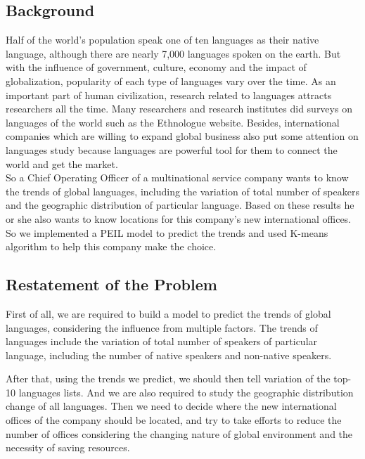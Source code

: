 \documentclass{mcmthesis}
\begin{document}
\subsection{Background}
  \indent \indent Half of the world's population speak one of ten languages as their native language, although there are nearly 7,000 languages spoken on the earth. But with the influence of government, culture, economy and the impact of globalization, popularity of each type of languages vary over the time. As an important part of human civilization, research related to languages attracts researchers all the time. Many researchers and research institutes did surveys on languages of the world such as the Ethnologue website. Besides, international companies which are  willing to expand global business also put some attention on languages study because languages are powerful tool for them to connect the world and get the market. \\
  \indent So a Chief Operating Officer of a multinational service company wants to know the trends of global languages, including the variation of total number of speakers and the geographic distribution of particular language. Based on these results he or she also wants to know locations for this company's new international offices. So we implemented a PEIL model to predict the trends and used K-means algorithm to help this company make the choice.
\subsection{Restatement of the Problem}
  \indent \indent First of all, we are required to build a model to predict the trends of global languages, considering the influence from multiple factors. The trends of languages include the variation of total number of speakers of particular language, including the number of native speakers and non-native speakers. 
  
  \indent After that, using the trends we predict, we should then tell variation of the top-10 languages lists. And we are also required to study the geographic distribution change of all languages. Then we need to decide where the new international offices of the company should be located, and try to take efforts to reduce the number of offices considering the changing nature of global environment and the necessity of saving resources.
 
\end{document}
